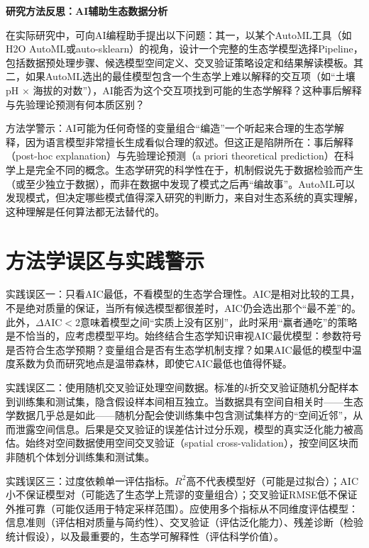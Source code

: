 \documentclass[
  twoside,12pt,fontset=none]{ctexbook}
\renewenvironment{quote}{%
  \def\FrameCommand{{\color{quote-border}\vrule width 4pt}\hspace{10pt}}%
  \MakeFramed {\advance\hsize-\width \FrameRestore\noindent\ignorespaces}%
}{%
  \endMakeFramed
}
\begin{document}
\begin{quote}
\textbf{研究方法反思：AI辅助生态数据分析}

在实际研究中，可向AI编程助手提出以下问题：其一，以某个AutoML工具（如H2O AutoML或auto-sklearn）的视角，设计一个完整的生态学模型选择Pipeline，包括数据预处理步骤、候选模型空间定义、交叉验证策略设定和结果解读模板。其二，如果AutoML选出的最佳模型包含一个生态学上难以解释的交互项（如``土壤pH \(\times\) 海拔的对数''），AI能否为这个交互项找到可能的生态学解释？这种事后解释与先验理论预测有何本质区别？

方法学警示：AI可能为任何奇怪的变量组合``编造''一个听起来合理的生态学解释，因为语言模型非常擅长生成看似合理的叙述。但这正是陷阱所在：事后解释（post-hoc explanation）与先验理论预测（a priori theoretical prediction）在科学上是完全不同的概念。生态学研究的科学性在于，机制假说先于数据检验而产生（或至少独立于数据），而非在数据中发现了模式之后再``编故事''。AutoML可以发现模式，但决定哪些模式值得深入研究的判断力，来自对生态系统的真实理解，这种理解是任何算法都无法替代的。
\end{quote}

\hypertarget{ux65b9ux6cd5ux5b66ux8befux533aux4e0eux5b9eux8df5ux8b66ux793a-7}{%
\section{方法学误区与实践警示}\label{ux65b9ux6cd5ux5b66ux8befux533aux4e0eux5b9eux8df5ux8b66ux793a-7}}

实践误区一：只看AIC最低，不看模型的生态学合理性。AIC是相对比较的工具，不是绝对质量的保证，当所有候选模型都很差时，AIC仍会选出那个``最不差''的。此外，\(\Delta\text{AIC} < 2\)意味着模型之间``实质上没有区别''，此时采用``赢者通吃''的策略是不恰当的，应考虑模型平均。始终结合生态学知识审视AIC最优模型：参数符号是否符合生态学预期？变量组合是否有生态学机制支撑？如果AIC最低的模型中温度系数为负而研究地点是温带森林，即使它AIC最低也值得怀疑。

实践误区二：使用随机交叉验证处理空间数据。标准的\(k\)折交叉验证随机分配样本到训练集和测试集，隐含假设样本间相互独立。当数据具有空间自相关时------生态学数据几乎总是如此------随机分配会使训练集中包含测试集样方的``空间近邻''，从而泄露空间信息。后果是交叉验证的误差估计过分乐观，模型的真实泛化能力被高估。始终对空间数据使用空间交叉验证（spatial cross-validation），按空间区块而非随机个体划分训练集和测试集。

实践误区三：过度依赖单一评估指标。\(R^2\)高不代表模型好（可能是过拟合）；AIC小不保证模型对（可能选了生态学上荒谬的变量组合）；交叉验证RMSE低不保证外推可靠（可能仅适用于特定采样范围）。应使用多个指标从不同维度评估模型：信息准则（评估相对质量与简约性）、交叉验证（评估泛化能力）、残差诊断（检验统计假设），以及最重要的，生态学可解释性（评估科学价值）。
\end{document}
